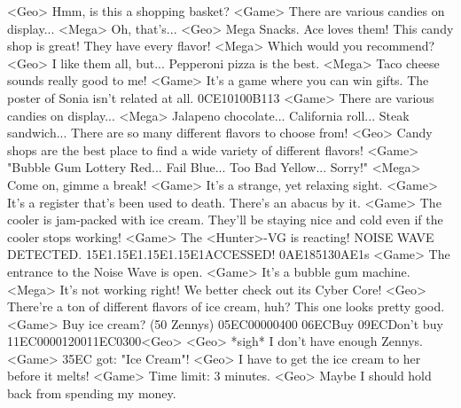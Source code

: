 <Geo> Hmm, is this a shopping basket? 
<Game> There are various candies on display... 
<Mega> Oh, that's... 
<Geo> Mega Snacks. Ace loves them! 
This candy shop is great! They have every flavor! 
<Mega> Which would you recommend? 
<Geo> I like them all, but... Pepperoni pizza is the best. 
<Mega> Taco cheese sounds really good to me! 
<Game> It's a game where you can win gifts. 
The poster of Sonia isn't related at all. 
{0C}{E1}{01}{00}{B1}{13}
<Game> There are various candies on display... 
<Mega> Jalapeno chocolate... California roll... Steak sandwich... 
There are so many different flavors to choose from! 
<Geo> Candy shops are the best place to find a wide variety of different flavors! 
<Game> "Bubble Gum Lottery   Red... Fail   Blue... Too Bad 
  Yellow... Sorry!" 
<Mega> Come on, gimme a break! 
<Game> It's a strange, yet relaxing sight. 
<Game> It's a register that's been used to death. 
There's an abacus by it. 
<Game> The cooler is jam-packed with ice cream. 
They'll be staying nice and cold even if the cooler stops working! 
<Game> The <Hunter>-VG is reacting! 
NOISE WAVE DETECTED. {15}{E1}.{15}{E1}.{15}{E1}.{15}{E1}ACCESSED! 
{0A}{E1}{85}{13}{0A}{E1}s
<Game> The entrance to the Noise Wave is open. 
<Game> It's a bubble gum machine. 
<Mega> It's not working right! We better check out its Cyber Core! 
<Geo> There're a ton of different flavors of ice cream, huh? This one looks pretty good. 
<Game> Buy ice cream? (50 Zennys) {05}{EC}{00}{00}{04}{00}  {06}{EC}Buy   {09}{EC}Don't buy 
{11}{EC}{00}{00}{12}{00}{11}{EC}{03}{00}<Geo>
<Geo> *sigh* I don't have enough Zennys. 
<Game> {35}{EC} got: "Ice Cream"! 
<Geo> I have to get the ice cream to her before it melts! 
<Game> Time limit: 3 minutes. 
<Geo> Maybe I should hold back from spending my money. 
